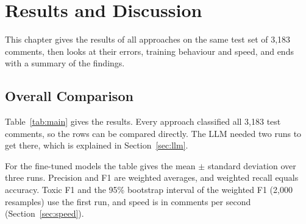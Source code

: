 \chapter{Results and Discussion}
\justifying

This chapter gives the results of all approaches on the same test set of 3,183 comments, then looks at their errors, training behaviour and speed, and ends with a summary of the findings.

\section{Overall Comparison}

Table~\ref{tab:main} gives the results. Every approach classified all 3,183 test comments, so the rows can be compared directly. The LLM needed two runs to get there, which is explained in Section~\ref{sec:llm}.

\begin{table}[H]
  \centering
  \caption[Results on the test set]{Results on the test set (3,183 comments).}
  \label{tab:main}
  \footnotesize
\end{table}

For the fine-tuned models the table gives the mean $\pm$ standard deviation over three runs. Precision and F1 are weighted averages, and weighted recall equals accuracy. Toxic F1 and the 95\% bootstrap interval of the weighted F1 (2,000 resamples) use the first run, and speed is in comments per second (Section~\ref{sec:speed}).

